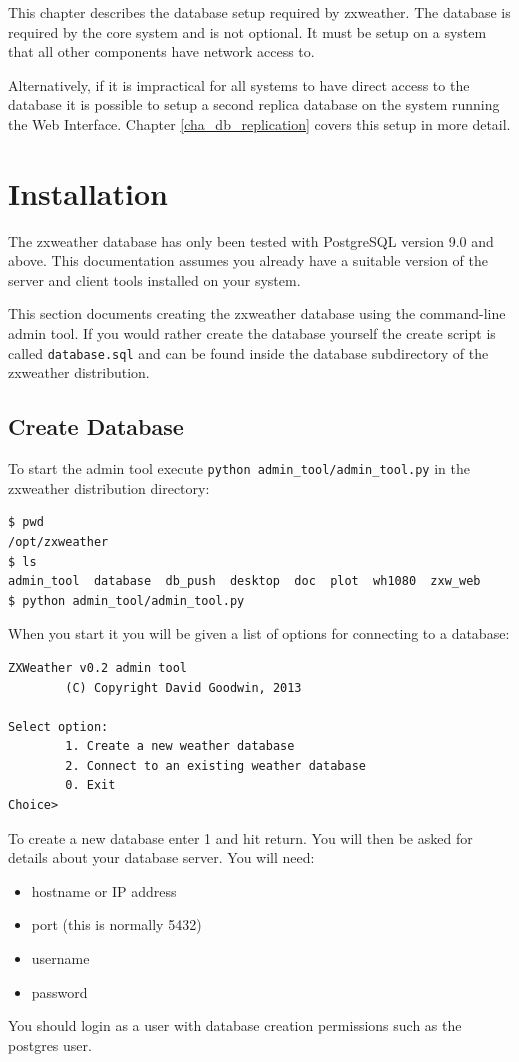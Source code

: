 \documentclass[a4paper,10pt,draft]{book}
\begin{document}
This chapter describes the database setup required by zxweather. The database is required by the core system and is not optional. It must be setup on a system that all other components have network access to.

Alternatively, if it is impractical for all systems to have direct access to the database it is possible to setup a second replica database on the system running the Web Interface. Chapter \ref{cha_db_replication} covers this setup in more detail.

\section{Installation}
The zxweather database has only been tested with PostgreSQL version 9.0 and above. This documentation assumes you already have a suitable version of the server and client tools installed on your system.

This section documents creating the zxweather database using the command-line admin tool. If you would rather create the database yourself the create script is called \verb|database.sql| and can be found inside the database subdirectory of the zxweather distribution. 


\subsection{Create Database}
To start the admin tool execute \verb|python admin_tool/admin_tool.py| in the zxweather distribution directory:

\begin{verbatim}
$ pwd
/opt/zxweather
$ ls
admin_tool  database  db_push  desktop  doc  plot  wh1080  zxw_web
$ python admin_tool/admin_tool.py
\end{verbatim}

When you start it you will be given a list of options for connecting to a database:
\begin{verbatim}
ZXWeather v0.2 admin tool
        (C) Copyright David Goodwin, 2013

Select option:
        1. Create a new weather database
        2. Connect to an existing weather database
        0. Exit
Choice>
\end{verbatim}

To create a new database enter 1 and hit return. You will then be asked for details about your database server. You will need:
\begin{itemize}
\item hostname or IP address
\item port (this is normally 5432)
\item username
\item password
\end{itemize}
You should login as a user with database creation permissions such as the postgres user.
\end{document}

